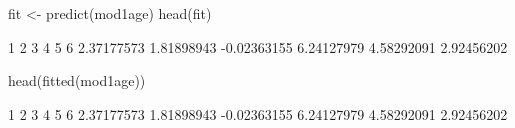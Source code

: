 \begin{Schunk}
\begin{Sinput}
 fit <- predict(mod1age)
 head(fit)
\end{Sinput}
\begin{Soutput}
          1           2           3           4           5           6 
 2.37177573  1.81898943 -0.02363155  6.24127979  4.58292091  2.92456202 
\end{Soutput}
\begin{Sinput}
 head(fitted(mod1age))
\end{Sinput}
\begin{Soutput}
          1           2           3           4           5           6 
 2.37177573  1.81898943 -0.02363155  6.24127979  4.58292091  2.92456202 
\end{Soutput}
\end{Schunk}
